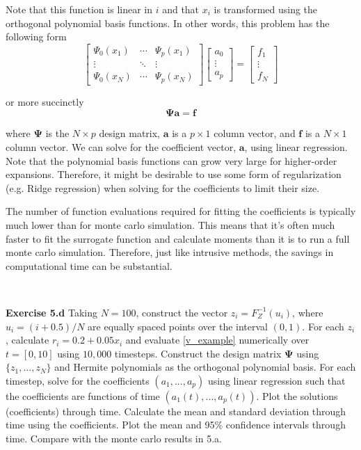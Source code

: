 \documentclass[11pt]{article}
\numberwithin{equation}{section}
\begin{document}
Note that this function is linear in $i$ and that $x_i$ is transformed using the orthogonal polynomial basis functions. In other words, this problem has the following form
\begin{equation}
\begin{bmatrix} \Psi_0(x_1) & \cdots & \Psi_p(x_1) \\ \vdots & \ddots & \vdots \\ \Psi_0(x_N) & \cdots & \Psi_p(x_N) \end{bmatrix}
\begin{bmatrix} a_0 \\  \vdots \\  a_p \end{bmatrix}
=
\begin{bmatrix} f_1 \\  \vdots \\  f_N \end{bmatrix}
\end{equation}

or more succinctly
\begin{equation}
\mathbf{\Psi} \mathbf{a} = \mathbf{f}
\end{equation}

where $\mathbf{\Psi}$ is the $N \times p$ design matrix, $\mathbf{a}$ is a $p \times 1$ column vector, and $\mathbf{f}$ is a $N \times 1$ column vector. We can solve for the coefficient vector, $\mathbf{a}$, using linear regression. Note that the polynomial basis functions can grow very large for higher-order expansions. Therefore, it might be desirable to use some form of regularization (e.g. Ridge regression) when solving for the coefficients to limit their size. 

\qquad The number of function evaluations required for fitting the coefficients is typically much lower than for monte carlo simulation. This means that it's often much faster to fit the surrogate function and calculate moments than it is to run a full monte carlo simulation. Therefore, just like intrusive methods, the savings in computational time can be substantial.



\

\textbf{Exercise 5.d} Taking $N = 100$, construct the vector $z_i = F_Z^{-1}(u_i)$, where $u_i = (i + 0.5)/N$ are equally spaced points over the interval $(0, 1)$. For each $z_i$, calculate $r_i = 0.2 + 0.05 x_i$ and evaluate \eqref{v_example} numerically over $t = [0, 10]$ using $10,000$ timesteps. Construct the design matrix $\mathbf{\Psi}$ using $\{ z_1, ..., z_N \}$ and Hermite polynomials as the orthogonal polynomial basis. For each timestep, solve for the coefficients $(a_1, ..., a_p)$ using linear regression such that the coefficients are functions of time $(a_1(t), ..., a_p(t))$. Plot the solutions (coefficients) through time. Calculate the mean and standard deviation through time using the coefficients. Plot the mean and 95\% confidence intervals through time. Compare with the monte carlo results in 5.a.
\end{document}
